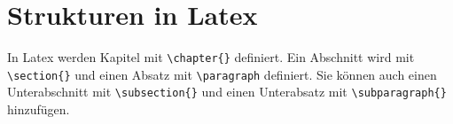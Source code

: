 \chapter{Strukturen in Latex}

In Latex werden Kapitel mit \verb+\chapter{}+ definiert. Ein Abschnitt wird mit \verb+\section{}+ und einen Absatz mit \verb+\paragraph+ definiert. Sie können auch einen Unterabschnitt mit \verb+\subsection{}+ und einen Unterabsatz mit \verb+\subparagraph{}+ hinzufügen.